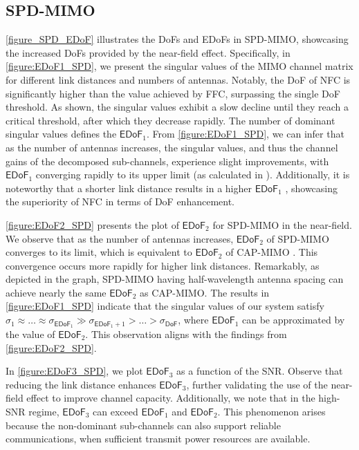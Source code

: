 \documentclass[journal]{IEEEtran}
\theoremstyle{definition}
\begin{document}
\subsection{SPD-MIMO}
{\figurename} {\ref{figure_SPD_EDoF}} illustrates the DoFs and EDoFs in SPD-MIMO, showcasing the increased DoFs provided by the near-field effect. Specifically, in {\figurename} {\ref{figure:EDoF1_SPD}}, we present the singular values of the MIMO channel matrix for different link distances and numbers of antennas. Notably, the DoF of NFC is significantly higher than the value achieved by FFC, surpassing the single DoF threshold. As shown, the singular values exhibit a slow decline until they reach a critical threshold, after which they decrease rapidly. The number of dominant singular values defines the ${\mathsf{EDoF}}_1$. From {\figurename} {\ref{figure:EDoF1_SPD}}, we can infer that as the number of antennas increases, the singular values, and thus the channel gains of the decomposed sub-channels, experience slight improvements, with ${\mathsf{EDoF}}_1$ converging rapidly to its upper limit (as calculated in \cite{Miller2000}). Additionally, it is noteworthy that a shorter link distance results in a higher ${\mathsf{EDoF}}_1$ \cite{Miller2000}, showcasing the superiority of NFC in terms of DoF enhancement.

{\figurename} {\ref{figure:EDoF2_SPD}} presents the plot of ${\mathsf{EDoF}}_2$ for SPD-MIMO in the near-field. We observe that as the number of antennas increases, ${\mathsf{EDoF}}_2$ of SPD-MIMO converges to its limit, which is equivalent to ${\mathsf{EDoF}}_2$ of CAP-MIMO \cite{Xie2023}. This convergence occurs more rapidly for higher link distances. Remarkably, as depicted in the graph, SPD-MIMO having half-wavelength antenna spacing can achieve nearly the same ${\mathsf{EDoF}}_2$ as CAP-MIMO. The results in {\figurename} {\ref{figure:EDoF1_SPD}} indicate that the singular values of our system satisfy $\sigma_1\approx\ldots\approx\sigma_{\mathsf{EDoF}_1}\gg \sigma_{\mathsf{EDoF}_1+1}>\ldots>\sigma_{\mathsf{DoF}}$, where ${\mathsf{EDoF}}_1$ can be approximated by the value of ${\mathsf{EDoF}}_2$. This observation aligns with the findings from {\figurename} {\ref{figure:EDoF2_SPD}}.

In {\figurename} {\ref{figure:EDoF3_SPD}}, we plot ${\mathsf{EDoF}}_3$ as a function of the SNR. Observe that reducing the link distance enhances ${\mathsf{EDoF}}_3$, further validating the use of the near-field effect to improve channel capacity. Additionally, we note that in the high-SNR regime, ${\mathsf{EDoF}}_3$ can exceed ${\mathsf{EDoF}}_1$ and ${\mathsf{EDoF}}_2$. This phenomenon arises because the non-dominant sub-channels can also support reliable communications, when sufficient transmit power resources are available.
\end{document}
